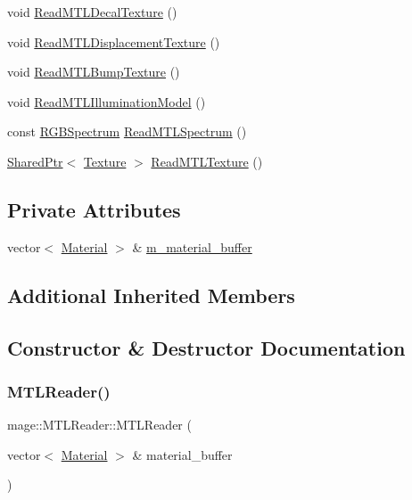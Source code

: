 \begin{DoxyCompactItemize}
void \hyperlink{classmage_1_1_m_t_l_reader_a578df3a55c79fba9d46616791b2e5539}{Read\+M\+T\+L\+Decal\+Texture} ()
\item 
void \hyperlink{classmage_1_1_m_t_l_reader_a9d4f8dea5a5582c5e7b788149110800c}{Read\+M\+T\+L\+Displacement\+Texture} ()
\item 
void \hyperlink{classmage_1_1_m_t_l_reader_acf7aacf933f842d3e14af92d161acd5b}{Read\+M\+T\+L\+Bump\+Texture} ()
\item 
void \hyperlink{classmage_1_1_m_t_l_reader_a77bbb659fe66e9bad451281dbd0c49d7}{Read\+M\+T\+L\+Illumination\+Model} ()
\item 
const \hyperlink{structmage_1_1_r_g_b_spectrum}{R\+G\+B\+Spectrum} \hyperlink{classmage_1_1_m_t_l_reader_a607a55ab2e68d3bc9b879d7e3377f0e3}{Read\+M\+T\+L\+Spectrum} ()
\item 
\hyperlink{namespacemage_a1e01ae66713838a7a67d30e44c67703e}{Shared\+Ptr}$<$ \hyperlink{classmage_1_1_texture}{Texture} $>$ \hyperlink{classmage_1_1_m_t_l_reader_a7ff401dab1b58709debff6cbe2c02d0c}{Read\+M\+T\+L\+Texture} ()
\end{DoxyCompactItemize}
\subsection*{Private Attributes}
\begin{DoxyCompactItemize}
\item 
vector$<$ \hyperlink{structmage_1_1_material}{Material} $>$ \& \hyperlink{classmage_1_1_m_t_l_reader_a6382e0e9fce6581b129d18f5d82994c2}{m\+\_\+material\+\_\+buffer}
\end{DoxyCompactItemize}
\subsection*{Additional Inherited Members}


\subsection{Constructor \& Destructor Documentation}
\hypertarget{classmage_1_1_m_t_l_reader_a924f813cca170e2592a6e7d2a3255be8}{}\label{classmage_1_1_m_t_l_reader_a924f813cca170e2592a6e7d2a3255be8} 
\subsubsection{\texorpdfstring{M\+T\+L\+Reader()}{MTLReader()}\hspace{0.1cm}{\footnotesize\ttfamily [1/3]}}
{\footnotesize\ttfamily mage\+::\+M\+T\+L\+Reader\+::\+M\+T\+L\+Reader (\begin{DoxyParamCaption}\item[{vector$<$ \hyperlink{structmage_1_1_material}{Material} $>$ \&}]{material\+\_\+buffer }\end{DoxyParamCaption})\hspace{0.3cm}{\ttfamily [explicit]}}

